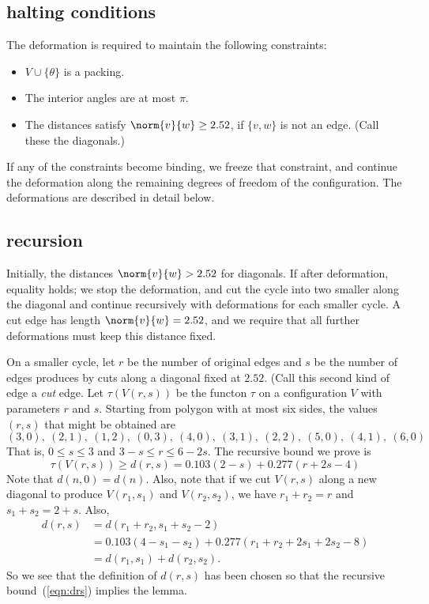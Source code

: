 \subsection{halting conditions}

The deformation is required to maintain the following
constraints:
\begin{itemize}
\item $V\cup\{\theta\}$ is a packing.
\item The interior angles are at most $\pi$.
\item The distances satisfy $\norm{v}{w}\ge 2.52$, if $\{v,w\}$ is
not an edge.  (Call these the diagonals.)
\end{itemize}
If any of the constraints become binding, we freeze that
constraint, and continue the deformation along the remaining degrees of freedom of the configuration.  The deformations are described in detail below.

\subsection{recursion}

Initially, the distances $\norm{v}{w}>2.52$ for diagonals.
If after deformation, equality holds; we stop the deformation, and cut the cycle into two smaller along the diagonal
and continue recursively with deformations for each smaller cycle.  A cut edge has length $\norm{v}{w}=2.52$, and
we require that all further deformations must keep this distance fixed.  

On a smaller cycle, let $r$ be the number of original edges and $s$ be the number of edges produces by cuts along a diagonal fixed at $2.52$.  (Call this second kind of edge a {\it cut} edge.  Let $\tau(V(r,s))$ be the functon $\tau$ on a configuration $V$ with parameters $r$ and $s$.  Starting from polygon with at most six sides, the values $(r,s)$ that might be obtained are
$$
(3,0),~(2,1),~(1,2),~(0,3),~
(4,0),~(3,1),~(2,2),~
(5,0),~(4,1),~
(6,0)
$$
That is, $0\le s\le 3$ and $3-s\le r\le 6-2s$.
The recursive bound we prove is
\begin{equation}\label{eqn:drs}
\tau(V(r,s)) \ge d(r,s) = 0.103 (2-s) + 0.277 (r+2s-4) 
\end{equation}
Note that $d(n,0) = d(n)$. Also, note that if we cut
$V(r,s)$ along a new diagonal to produce $V(r_1,s_1)$
and $V(r_2,s_2)$, we have $r_1+r_2=r$ and $s_1+s_2 = 2+s$.
Also,
$$
\begin{array}{lll}
d(r,s) &= d(r_1+r_2,s_1+s_2-2) \\
  &=0.103 (4-s_1-s_2) + 0.277 (r_1+r_2+2s_1+2s_2-8) \\
  &=d(r_1,s_1) + d(r_2,s_2).
\end{array}
$$
So we see that the definition of $d(r,s)$ has been
chosen so that the recursive 
bound~(\ref{eqn:drs}) implies the
lemma.

